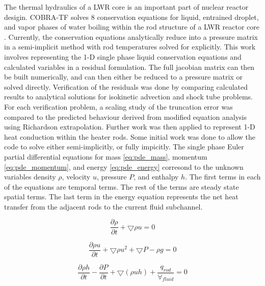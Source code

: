 	The thermal hydraulics of a LWR core is an important part of nuclear
	reactor desigin. COBRA-TF solves 8 conservation equations for liquid,
	entrained droplet, and vapor phases of water boiling within the rod structure
	of a LWR reactor core \cite{Salko2014}. Currently, the conservation
	equations analytically reduce into a pressure matrix in a semi-implicit
	method with rod temperatures solved for explicitly. This work involves
	representing the 1-D single phase liquid conservation equations and calculated 
	variables in a residual formulation. The full jacobian matrix can then be
	built numerically, and  can then either be reduced to a pressure matrix or
	solved directly. Verification of the residuals was done by comparing
	calculated results to analytical solutions for isokinetic advection and shock
	tube problems. For each verification problem, a scaling study of the
	truncation error was compared to the predicted behaviour derived from modified
	equation analysis using Richardson extrapolation. Further work was then
	applied to represent 1-D heat conduction within the heater rods. Some initial
	work was done to allow the code to solve either semi-implicitly, or fully impicitly.
    The single phase Euler partial differential equations for mass
    \eqref{eq:pde_mass}, momentum \eqref{eq:pde_momentum}, and energy
    \eqref{eq:pde_energy} corresond to the unknown variables density $\rho$,
    velocity $u$, pressure $P$, and enthalpy $h$. The first terms in each of the
    equations are temporal terms. The rest of the terms are steady state spatial
    terms. The last term in the energy equation represents the net heat transfer
    from the adjacent rods to the current fluid subchannel.
    
    \begin{equation}
    	\label{eq:pde_mass}
    	\frac{ \partial \rho}{\partial t} + \bigtriangledown \rho u = 0
    \end{equation}
    
    \begin{equation}
    	\label{eq:pde_momentum}
    	\frac{ \partial \rho u}{\partial t} + \bigtriangledown \rho u^{2} +
    	\bigtriangledown P - \rho g  = 0
    \end{equation}
    
    \begin{equation}
    	\label{eq:pde_energy}
    	\frac{ \partial \rho h}{\partial t} -
    	\frac{ \partial  P}{\partial t} + 
    	\bigtriangledown ( \rho  u h )%
    	+ \frac{q_{rod}}{\forall_{fluid}}
    	= 0
    \end{equation}
    
